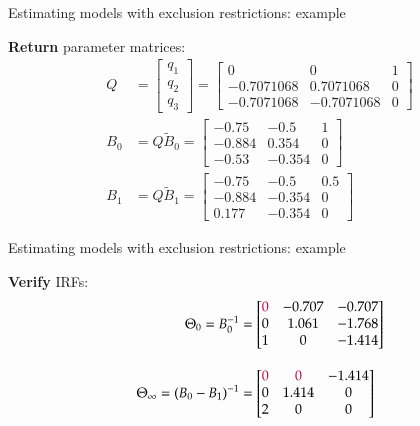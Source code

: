\documentclass[notes,blackandwhite,mathsans,usenames,dvipsnames]{beamer}
\begin{document}
\begin{frame}{Estimating models with exclusion restrictions: example}

\textbf{Return} parameter matrices:
\begin{align*}
Q &= \begin{bmatrix}q_1\\q_2\\q_3\end{bmatrix} = \begin{bmatrix} 0&0&1 \\-0.7071068&0.7071068&0 \\-0.7071068&-0.7071068&0 \end{bmatrix}\\[2ex]
B_0 &= Q\tilde{B}_0 = \begin{bmatrix} -0.75&-0.5&1\\-0.884&0.354&0\\-0.53&-0.354&0 \end{bmatrix}\\[2ex]
B_1 &= Q\tilde{B}_1 = \begin{bmatrix} -0.75&-0.5&0.5\\-0.884&-0.354&0\\0.177&-0.354&0 \end{bmatrix}
\end{align*}

\end{frame}




\begin{frame}{Estimating models with exclusion restrictions: example}

\textbf{Verify} IRFs:
\begin{align*}
\Theta_0 = B_0^{-1} &= \begin{bmatrix} {\color{purple}0}&-0.707&-0.707\\0&1.061&-1.768\\1&0&-1.414 \end{bmatrix}\\[2ex]
\Theta_{\infty} = (B_0 - B_1)^{-1} &= \begin{bmatrix} {\color{purple}0}&{\color{purple}0}&-1.414\\0&1.414&0\\2&0&0 \end{bmatrix}
\end{align*}

\end{frame}
\end{document}
